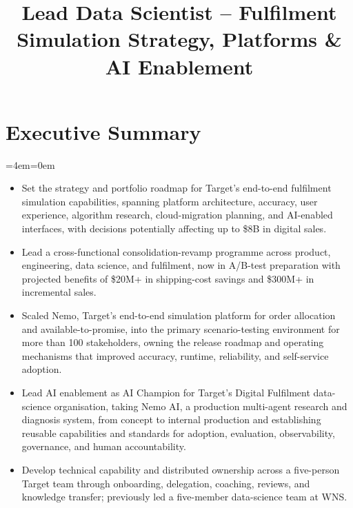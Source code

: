 \documentclass[11pt,a4paper]{moderncv}
\title{\Large Lead Data Scientist -- Fulfilment Simulation Strategy, Platforms \& AI Enablement}
\begin{document}
\makecvtitle

\newenvironment{smallblockquote}{
  \par
  \medskip
  \leftskip=2em\rightskip=0em
  \noindent\ignorespaces
  }{\par\medskip}

\newenvironment{blockquote}{
  \par
  \medskip
  \leftskip=4em\rightskip=0em
  \noindent\ignorespaces
  }{\par\medskip}

\hypertarget{executive-summary}{
\section{Executive Summary}\label{executive-summary}}

\begingroup
  \par
  \medskip
  \leftskip=4em\rightskip=0em
  \noindent\ignorespaces

\begin{itemize}
    \item Set the strategy and portfolio roadmap for Target's end-to-end fulfilment simulation capabilities, spanning platform architecture, accuracy, user experience, algorithm research, cloud-migration planning, and AI-enabled interfaces, with decisions potentially affecting up to \$8B in digital sales.
    \item Lead a cross-functional consolidation-revamp programme across product, engineering, data science, and fulfilment, now in A/B-test preparation with projected benefits of \$20M+ in shipping-cost savings and \$300M+ in incremental sales.
    \item Scaled Nemo, Target's end-to-end simulation platform for order allocation and available-to-promise, into the primary scenario-testing environment for more than 100 stakeholders, owning the release roadmap and operating mechanisms that improved accuracy, runtime, reliability, and self-service adoption.
    \item Lead AI enablement as AI Champion for Target's Digital Fulfilment data-science organisation, taking Nemo AI, a production multi-agent research and diagnosis system, from concept to internal production and establishing reusable capabilities and standards for adoption, evaluation, observability, governance, and human accountability.
    \item Develop technical capability and distributed ownership across a five-person Target team through onboarding, delegation, coaching, reviews, and knowledge transfer; previously led a five-member data-science team at WNS.
\end{itemize}
\end{document}

